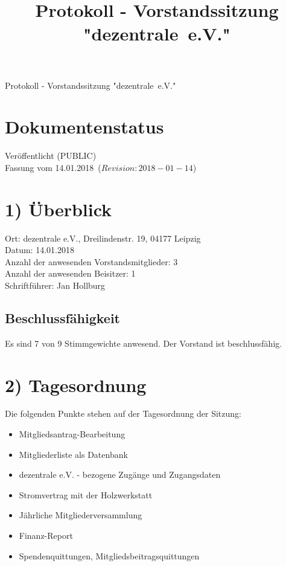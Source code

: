 \documentclass[10pt,a4paper]{scrartcl}
\newcommand{\qs}[1]{"#1"}
\newcommand{\name}{dezentrale}
\newcommand{\revision}{$Revision: 2018-01-14$}
\newcommand{\eventdate}{14.01.2018}
\newcommand{\schriftfuehrer}{Jan Hollburg}
\newcommand{\documentstatus}{Ver{\"o}ffentlicht (PUBLIC)}
\begin{document}
\title{Protokoll - Vorstandssitzung \qs{\name\ e.V.}}
{\LARGE Protokoll - Vorstandssitzung \qs{\name\ e.V.}}

\section*{Dokumentenstatus}
\documentstatus\\
Fassung vom \eventdate\ (\revision)

\section*{1) {\"U}berblick}
    Ort: dezentrale e.V., Dreilindenstr. 19, 04177 Leipzig\\
    Datum: \eventdate\\
    Anzahl der anwesenden Vorstandsmitglieder: 3\\
    Anzahl der anwesenden Beisitzer: 1\\
    Schriftf{\"u}hrer: \schriftfuehrer
\subsection*{Beschlussf{\"a}higkeit}
    Es sind 7 von 9 Stimmgewichte anwesend. Der Vorstand ist beschlussf{\"a}hig.

\section*{2) Tagesordnung}
	Die folgenden Punkte stehen auf der Tagesordnung der Sitzung:
	\begin{itemize}
		\item Mitgliedsantrag-Bearbeitung
		\item Mitgliederliste als Datenbank
		\item dezentrale e.V. - bezogene Zug{\"a}nge und Zugangsdaten
		\item Stromvertrag mit der Holzwerkstatt
		\item J{\"a}hrliche Mitgliederversammlung
		\item Finanz-Report
		\item Spendenquittungen, Mitgliedsbeitragsquittungen

	\end{itemize}
\end{document}
